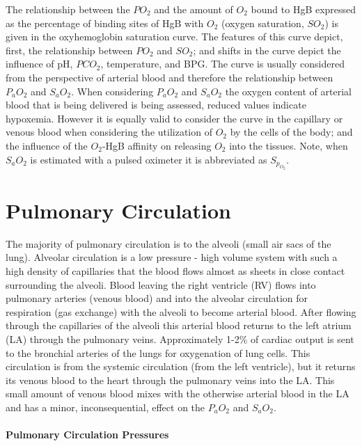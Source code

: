 The relationship between the $PO_2$ and the amount of $O_2$ bound to HgB expressed as the percentage of binding sites of HgB with $O_2$ (oxygen saturation, $SO_2$) is given in the oxyhemoglobin saturation curve. The features of this curve depict, first, the relationship between $PO_2$ and $SO_2$; and shifts in the curve depict the influence of pH, $PCO_2$, temperature, and BPG. The curve is usually considered from the perspective of arterial blood and therefore the relationship between $P_aO_2$ and $S_aO_2$. When considering $P_aO_2$ and $S_aO_2$ the oxygen content of arterial blood that is being delivered is being assessed, reduced values indicate hypoxemia. However it is equally valid to consider the curve in the capillary or venous blood when considering the utilization of $O_2$ by the cells of the body; and the influence of the $O_2$-HgB affinity on releasing $O_2$ into the tissues.
Note, when $S_aO_2$ is estimated with a pulsed oximeter it is abbreviated as $S_p_O_2$.




\section{Pulmonary Circulation}

The majority of pulmonary circulation is to the alveoli (small air sacs of the lung). Alveolar circulation is a low pressure - high volume system with such a high density of capillaries that the blood flows almost as sheets in close contact surrounding the alveoli. Blood leaving the right ventricle (RV) flows into pulmonary arteries (venous blood) and into the alveolar circulation for respiration (gas exchange) with the alveoli to become arterial blood. After flowing through the capillaries of the alveoli this arterial blood returns to the left atrium (LA) through the pulmonary veins. 
Approximately 1-2\% of cardiac output is sent to the bronchial arteries of the lungs for oxygenation of lung cells. This circulation is from the systemic circulation (from the left ventricle), but it returns its venous blood to the heart through the pulmonary veins into the LA. This small amount of venous blood mixes with the otherwise arterial blood in the LA and has a minor, inconsequential, effect on the $P_aO_2$ and $S_aO_2$.

\paragraph{Pulmonary Circulation Pressures}

